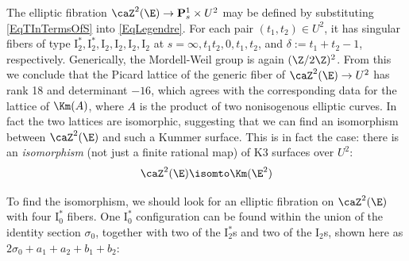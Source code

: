 \documentclass{article}
\def\P{\mathbf{P}}
\newcommand{\I}{\mathrm{I}}
\begin{document}
The elliptic fibration $\caZ^2(\E)\to \P^1_s\times U^2$ may be defined by substituting \eqref{EqTInTermsOfS} into \eqref{EqLegendre}.  For each pair $(t_1,t_2)\in U^2$, it has singular fibers of type $\I_2^*,\I_2^*,\I_2,\I_2,\I_2,\I_2$ at $s=\infty,t_1t_2,0,t_1,t_2$, and $\delta:=t_1+t_2-1$, respectively.  Generically, the Mordell-Weil group is again $(\Z/2\Z)^2$.  From this we conclude that the Picard lattice of the generic fiber of $\caZ^2(\E)\to U^2$ has rank 18 and determinant $-16$, which agrees with the corresponding data for the lattice of $\Km(A)$, where $A$ is the product of two nonisogenous elliptic curves. In fact the two lattices are isomorphic, suggesting that we can find an isomorphism between $\caZ^2(\E)$ and such a Kummer surface.  This is in fact the case:  there is an {\em isomorphism} (not just a finite rational map) of K3 surfaces over $U^2$:
\[ \caZ^2(\E) \isomto \Km(\E^2)  \]

To find the isomorphism, we should look for an elliptic fibration on $\caZ^2(\E)$ with four $\I_0^*$ fibers.  One $\I_0^*$ configuration can be found within the union of the identity section $\sigma_0$, together with two of the $\I_2^*$s and two of the $\I_2$s, shown here as $2\sigma_0+a_1+a_2+b_1+b_2$:

\end{document}
